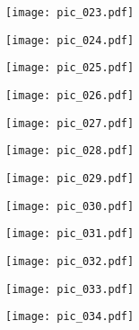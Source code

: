 \documentclass[12pt,a4paper]{article}
\begin{document}
\newpage
\bigtitle
\begin{figure}[H]
\texttt{[image: pic\_023.pdf]}
\end{figure}

\newpage
\bigtitle
\begin{figure}[H]
\texttt{[image: pic\_024.pdf]}
\end{figure}

\newpage
\bigtitle
\begin{figure}[H]
\texttt{[image: pic\_025.pdf]}
\end{figure}

\newpage
\bigtitle
\begin{figure}[H]
\texttt{[image: pic\_026.pdf]}
\end{figure}

\newpage
\bigtitle
\begin{figure}[H]
\texttt{[image: pic\_027.pdf]}
\end{figure}

\newpage
\bigtitle
\begin{figure}[H]
\texttt{[image: pic\_028.pdf]}
\end{figure}

\newpage
\bigtitle
\begin{figure}[H]
\texttt{[image: pic\_029.pdf]}
\end{figure}

\newpage
\bigtitle
\begin{figure}[H]
\texttt{[image: pic\_030.pdf]}
\end{figure}

\newpage
\bigtitle
\begin{figure}[H]
\texttt{[image: pic\_031.pdf]}
\end{figure}

\newpage
\bigtitle
\begin{figure}[H]
\texttt{[image: pic\_032.pdf]}
\end{figure}

\newpage
\bigtitle
\begin{figure}[H]
\texttt{[image: pic\_033.pdf]}
\end{figure}

\newpage
\bigtitle
\begin{figure}[H]
\texttt{[image: pic\_034.pdf]}
\end{figure}
\end{document}
